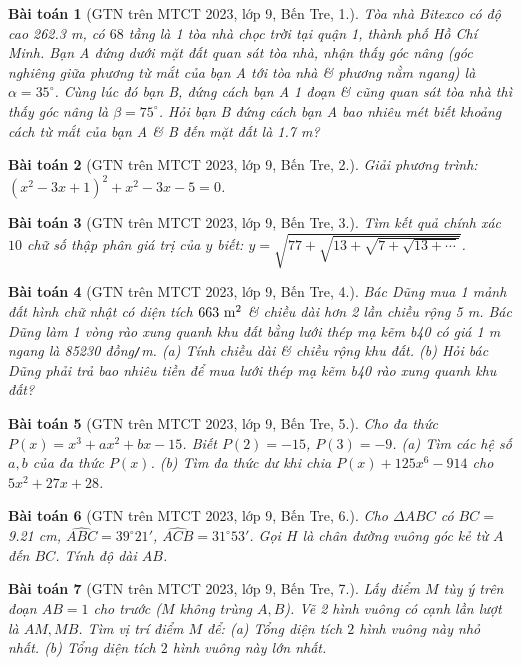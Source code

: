 \documentclass{article}
\newtheorem{baitoan}{Bài toán}
\begin{document}
\begin{baitoan}[GTN trên MTCT 2023, lớp 9, Bến Tre, 1.]
	Tòa nhà Bitexco có độ cao \emph{262.3 m}, có $68$ tầng là 1 tòa nhà chọc trời tại quận 1, thành phố Hồ Chí Minh. Bạn A đứng dưới mặt đất quan sát tòa nhà, nhận thấy góc nâng (góc nghiêng giữa phương từ mắt của bạn A tới tòa nhà \& phương nằm ngang) là $\alpha = 35^\circ$. Cùng lúc đó bạn B, đứng cách bạn A 1 đoạn \& cũng quan sát tòa nhà thì thấy góc nâng là $\beta = 75^\circ$. Hỏi bạn B đứng cách bạn A bao nhiêu mét biết khoảng cách từ mắt của bạn A \& B đến mặt đất là \emph{1.7 m}?
\end{baitoan}

\begin{baitoan}[GTN trên MTCT 2023, lớp 9, Bến Tre, 2.]
	Giải phương trình: $(x^2 - 3x + 1)^2 + x^2 - 3x - 5 = 0$.
\end{baitoan}

\begin{baitoan}[GTN trên MTCT 2023, lớp 9, Bến Tre, 3.]
	Tìm kết quả chính xác $10$ chữ số thập phân giá trị của $y$ biết: $y = \sqrt{77 + \sqrt{13 + \sqrt{7 + \sqrt{13 + \cdots}}}}$.
\end{baitoan}

\begin{baitoan}[GTN trên MTCT 2023, lớp 9, Bến Tre, 4.]
	Bác Dũng mua 1 mảnh đất hình chữ nhật có diện tích $\rm663\ m^2$ \& chiều dài hơn 2 lần chiều rộng \emph{5 m}. Bác Dũng làm 1 vòng rào xung quanh khu đất bằng lưới thép mạ kẽm b40 có giá \emph{1 m} ngang là \emph{85230 đồng\texttt{/}m}. (a) Tính chiều dài \& chiều rộng khu đất. (b) Hỏi bác Dũng phải trả bao nhiêu tiền để mua lưới thép mạ kẽm b40 rào xung quanh khu đất? 
\end{baitoan}

\begin{baitoan}[GTN trên MTCT 2023, lớp 9, Bến Tre, 5.]
	Cho đa thức $P(x) = x^3 + ax^2 + bx - 15$. Biết $P(2) = -15$, $P(3) = -9$. (a) Tìm các hệ số $a,b$ của đa thức $P(x)$. (b) Tìm đa thức dư khi chia $P(x) + 125x^6 - 914$ cho $5x^2 + 27x + 28$.
\end{baitoan}

\begin{baitoan}[GTN trên MTCT 2023, lớp 9, Bến Tre, 6.]
	Cho $\Delta ABC$ có $BC =$ \emph{9.21 cm}, $\widehat{ABC} = 39^\circ21'$, $\widehat{ACB} = 31^\circ53'$. Gọi $H$ là chân đường vuông góc kẻ từ $A$ đến $BC$. Tính độ dài $AB$.
\end{baitoan}

\begin{baitoan}[GTN trên MTCT 2023, lớp 9, Bến Tre, 7.]
	Lấy điểm $M$ tùy ý trên đoạn $AB = 1$ cho trước ($M$ không trùng $A,B$). Vẽ 2 hình vuông có cạnh lần lượt là $AM,MB$. Tìm vị trí điểm $M$ để: (a) Tổng diện tích $2$ hình vuông này nhỏ nhất. (b) Tổng diện tích $2$ hình vuông này lớn nhất.
\end{baitoan}
\end{document}
